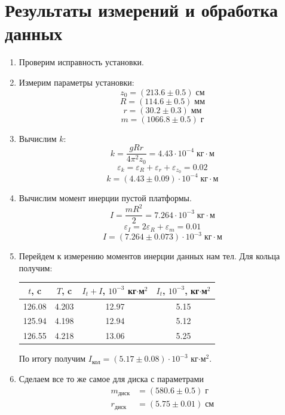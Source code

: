 \documentclass[a4, 12pt]{article}
\begin{document}
	\section{Результаты измерений и обработка данных}
	\begin{enumerate}
		\item Проверим исправность установки.
		\item Измерим параметры установки:
		$$ z_0 = (213.6\pm0.5) \;\text{см} $$
		$$ R = (114.6\pm0.5) \;\text{мм} $$
		$$ r = (30.2\pm0.3) \;\text{мм}  $$
		$$ m = (1066.8\pm0.5) \;\text{г} $$
		\item Вычислим $k$:
		$$ k = \frac{gRr}{4\pi^2z_0} = 4.43\cdot10^{-4} \;\text{кг}\cdot\text{м}$$
		$$ \varepsilon_k = \varepsilon_R + \varepsilon_r + \varepsilon_{z_0} = 0.02 $$
		$$ k = (4.43\pm0.09)\cdot10^{-4} \;\text{кг}\cdot\text{м}$$
		\item Вычислим момент инерции пустой платформы.
		$$ I = \frac{mR^2}{2} = 7.264\cdot10^{-3} \;\text{кг}\cdot\text{м} $$
		$$ \varepsilon_I = 2\varepsilon_R + \varepsilon_m = 0.01 $$
		$$ I = (7.264\pm0.073)\cdot10^{-3}\;\text{кг}\cdot\text{м} $$
		\item Перейдем к измерению моментов инерции данных нам тел.
		Для кольца получим:
		\begin{table}[H]
			\centering
			\begin{tabular}{|c|c|c|c|}
			\hline
			$t$, c & $T$, c & $I_t+I$, $10^{-3}$ кг$\cdot$м$^2$ & $I_t$, $10^{-3}$, кг$\cdot$м$^2$ \\ \hline
			126.08 & 4.203  & 12.97                             & 5.15                             \\ \hline
			125.94 & 4.198  & 12.94                             & 5.12                             \\ \hline
			126.55 & 4.218  & 13.06                             & 5.25                             \\ \hline
			\end{tabular}
			\end{table}
			По итогу получим $I_\text{кол} = (5.17\pm0.08)\cdot10^{-3}$ кг$\cdot$м$^2$.
		\item
    Сделаем все то же самое для диска с параметрами
    \begin{align*}
    m_{диск} &= (580.6 \pm 0.5) \;\text{г} \\
    r_{диск} &= (5.75 \pm 0.01) \;\text{см}
    \end{align*}


\end{enumerate}
\end{document}
